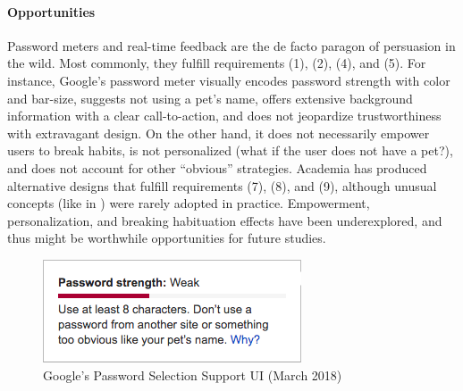 \paragraph{Opportunities} Password meters and real-time feedback are the de facto paragon of persuasion in the wild.  Most commonly, they fulfill requirements (1), (2), (4), and (5). For instance, Google's password meter visually encodes password strength with color and bar-size, suggests not using a pet's name, offers extensive background information with a clear call-to-action, and does not jeopardize trustworthiness with extravagant design. On the other hand, it does not necessarily empower users to break habits, is not personalized (what if the user does not have a pet?), and does not account for other ``obvious'' strategies. Academia has produced alternative designs that fulfill requirements (7), (8), and (9), although unusual concepts (like in \cite{Ur2012HowDoesYourPasswordMeasureUp}) were rarely adopted in practice. Empowerment, personalization, and breaking habituation effects have been underexplored, and thus might be worthwhile opportunities for future studies.

\begin{figure}
	\centering
	\includegraphics[width=0.4\linewidth]{figures/co-design/google-pw-meter}
	\caption{\label{fig:co-design:google-pw-meter} Google's Password Selection Support UI (March 2018)}
\end{figure}


